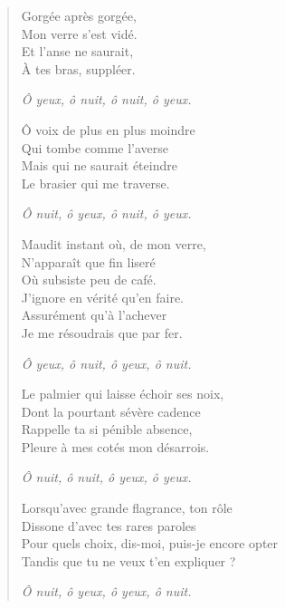 \begin{verse}%
  \monostique\quatrain%
  Gorgée après gorgée,\\  %
  Mon verre s’est vidé.\\  %
  Et l’anse ne saurait,\\  %
  À tes bras, suppléer.

  \emph{Ô yeux, ô nuit, ô nuit, ô yeux.}

  Ô voix de plus en plus moindre\\  %
  Qui tombe comme l’averse\\  %
  Mais qui ne saurait éteindre\\  %
  Le brasier qui me traverse.

  \emph{Ô nuit, ô yeux, ô nuit, ô yeux.}

  Maudit instant où, de mon verre,\\  %
  N’apparaît que fin liseré\\  %
  Où subsiste peu de café.\\  %
  J’ignore en vérité qu’en faire.\\  %
  Assurément qu’à l’achever\\  %
  Je me résoudrais que par fer.

  \emph{Ô yeux, ô nuit, ô yeux, ô nuit.}

  Le palmier qui laisse échoir ses noix,\\  %
  Dont la pourtant sévère  cadence\\  %
  Rappelle ta si pénible absence,\\  %
  Pleure à mes cotés mon désarrois.

  \emph{Ô nuit, ô nuit, ô yeux, ô yeux.}

  Lorsqu’avec grande flagrance, ton rôle\\  %
  Dissone d’avec tes rares paroles\\  %
  Pour quels choix, dis-moi, puis-je encore opter\\  %
  Tandis que tu ne veux t’en expliquer ?

  \emph{Ô nuit, ô yeux, ô yeux, ô nuit.}


\end{verse}
